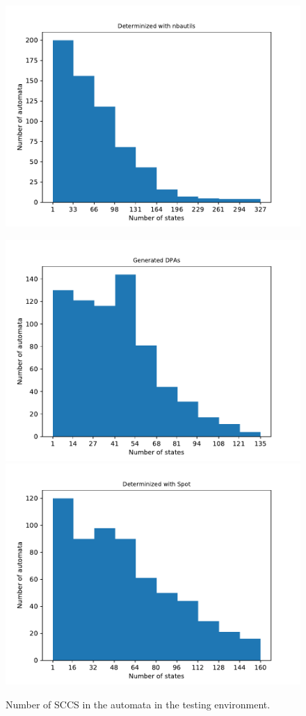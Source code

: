 \begin{figure}
\begin{minipage}{0.49\textwidth}
		\includegraphics[page=3,height=.3\textheight]{../data/analysis/rawstats_detnbaut.pdf}
		\caption{Number of SCCS in the automata in the testing environment.}
		\label{fig:rawstats:rawstats_sccs}
	\end{minipage}
	\hfill
	\begin{minipage}{0.49\textwidth}
		\includegraphics[page=4,height=.3\textheight]{../data/analysis/rawstats_gendet.pdf} 
		\includegraphics[page=4,height=.3\textheight]{../data/analysis/rawstats_detspot.pdf} 

\end{minipage}
\end{figure}

